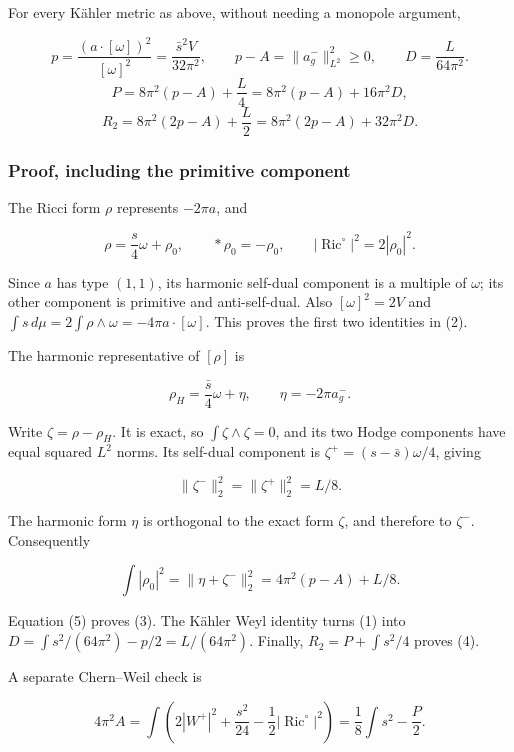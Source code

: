 \documentclass[
  11pt,
]{article}
\begin{document}
For every Kähler metric as above, without needing a monopole argument,

\[
 \boxed{
 p=\frac{(a\cdot[\omega])^2}{[\omega]^2}
   =\frac{\bar s^2V}{32\pi^2},\qquad
 p-A=\|a_g^-\|_{L^2}^2\ge0,\qquad
 D=\frac{L}{64\pi^2}.}
 \tag{2}
\] \[
 \boxed{
 P=8\pi^2(p-A)+\frac L4
   =8\pi^2(p-A)+16\pi^2D,}
 \tag{3}
\] \[
 \boxed{
 R_2=8\pi^2(2p-A)+\frac L2
    =8\pi^2(2p-A)+32\pi^2D.}
 \tag{4}
\]

\hypertarget{proof-including-the-primitive-component}{%
\subsubsection{Proof, including the primitive
component}\label{proof-including-the-primitive-component}}

The Ricci form \(\rho\) represents \(-2\pi a\), and

\[
 \rho=\frac{s}{4}\omega+\rho_0,
 \qquad *\rho_0=-\rho_0,
 \qquad |\operatorname{Ric}^{\circ}|^2=2|\rho_0|^2.
 \tag{5}
\]

Since \(a\) has type \((1,1)\), its harmonic self-dual component is a
multiple of \(\omega\); its other component is primitive and
anti-self-dual. Also \([\omega]^2=2V\) and
\(\int s\,d\mu=2\int\rho\wedge\omega=-4\pi a\cdot[\omega]\). This proves
the first two identities in (2).

The harmonic representative of \([\rho]\) is

\[
 \rho_H=\frac{\bar s}{4}\omega+\eta,
 \qquad \eta=-2\pi a_g^-.
\]

Write \(\zeta=\rho-\rho_H\). It is exact, so \(\int\zeta\wedge\zeta=0\),
and its two Hodge components have equal squared \(L^2\) norms. Its
self-dual component is \(\zeta^+=(s-\bar s)\omega/4\), giving

\[
 \|\zeta^-\|_2^2=\|\zeta^+\|_2^2=L/8.
\]

The harmonic form \(\eta\) is orthogonal to the exact form \(\zeta\),
and therefore to \(\zeta^-\). Consequently

\[
 \int|\rho_0|^2=\|\eta+\zeta^-\|_2^2
 =4\pi^2(p-A)+L/8.
\]

Equation (5) proves (3). The Kähler Weyl identity turns (1) into
\(D=\int s^2/(64\pi^2)-p/2=L/(64\pi^2)\). Finally, \(R_2=P+\int s^2/4\)
proves (4).

A separate Chern--Weil check is

\[
 4\pi^2 A=\int\left(2|W^+|^2+\frac{s^2}{24}-\frac12
 |\operatorname{Ric}^{\circ}|^2\right)
 =\frac18\int s^2-\frac P2.
 \tag{6}
\]
\end{document}

